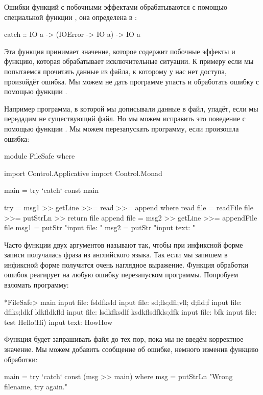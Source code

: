 Ошибки функций с побочными эффектами обрабатываются
с помощью специальной функции , она определена 
в :

\begin{code}
catch :: IO a -> (IOError -> IO a) -> IO a
\end{code}

Эта функция принимает значение, которое содержит побочные
эффекты и функцию, которая обрабатывает исключительные 
ситуации. К примеру если мы попытаемся прочитать данные
из файла, к которому у нас нет доступа, произойдёт ошибка.
Мы можем не дать программе упасть и обработать ошибку
с помощью функции .

Например программа, в которой мы дописывали данные в
файл, упадёт, если мы передадим не существующий файл.
Но мы можем исправить это поведение с помощью функции
. Мы можем перезапускать программу, если произошла
ошибка:

\begin{code}
module FileSafe where

import Control.Applicative
import Control.Monad

main = try `catch` const main

try = msg1 >> getLine >>= read >>= append
    where read   file = readFile file >>= putStrLn >> return file
          append file = msg2 >> getLine >>= appendFile file
          msg1        = putStr "input file: "
          msg2        = putStr "input text: "
\end{code}

Часто функции двух аргументов называют так, чтобы
при инфиксной форме записи получалась фраза из английского языка.
Так если мы запишем  в инфиксной форме получится
очень наглядное выражение. 
Функция обработки ошибок реагирует на любую ошибку
перезапуском программы. Попробуем взломать программу:

\begin{code}
*FileSafe> main
input file: fsldfksld
input file: sd;fls;dfl;vll; d;fld;f
input file: dflks;ldkf ldkfldkfld
input file: lsdkfksdlf ksdkflsdfkls;dfk
input file: bfk
input file: test
Hello!Hi)
input text: HowHow
\end{code}

Функция будет запрашивать файл до тех пор, пока мы 
не введём корректное значение. Мы можем добавить 
сообщение об ошибке, немного изменив функцию обработки:

\begin{code}
main = try `catch` const (msg >> main)
    where msg = putStrLn "Wrong filename, try again."
\end{code}

